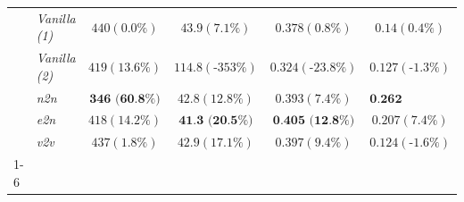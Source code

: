 \begin{table}[h]
\begin{tabular}{llcccc}
& \emph{Vanilla (1)}               &            $440 (0.0\%)$          &          $43.9 (7.1\%)$     &     $0.378 (0.8\%)$        &  $0.14 (0.4\%)$    \\
& \emph{Vanilla (2)}                 &            $419 (13.6\%)$          &          $114.8 (\text{-}353\%)$     &     $0.324 (\text{-}23.8\%)$        &  $0.127 (\text{-}1.3\%)$   \\
& \emph{n2n}                  &            $\textbf{346 (60.8\%)}$          &          $42.8 (12.8\%)$     &     $0.393 (7.4\%)$        &  $\textbf{0.262 (13.4\%)}$   \\
& \emph{e2n}                   &            $418 (14.2\%)$          &          $\textbf{41.3 (20.5\%)}$     &     $\textbf{0.405 (12.8\%)}$        &  $0.207 (7.4\%)$     \\
& \emph{v2v}                  &            $437 (1.8\%)$          &          $42.9 (17.1\%)$     &     $0.397 (9.4\%)$        &  $0.124 (\text{-}1.6\%)$        \\
\cmidrule(r){1-6}
\end{tabular}
\label{tab:main_results}
\end{table}

\raggedbottom